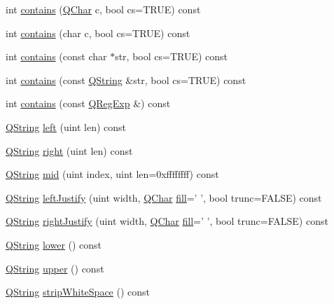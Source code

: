 \begin{DoxyCompactItemize}
\item 
int \hyperlink{class_q_string_ab8edfc96baa26c599be9a4c465723ed2}{contains} (\hyperlink{class_q_char}{Q\-Char} c, bool cs=T\-R\-U\-E) const 
\item 
int \hyperlink{class_q_string_a2ff9ac285923aa8c6f798a030730b80d}{contains} (char c, bool cs=T\-R\-U\-E) const 
\item 
int \hyperlink{class_q_string_abe7452ce01e2396702f7f158ebf38d22}{contains} (const char $\ast$str, bool cs=T\-R\-U\-E) const 
\item 
int \hyperlink{class_q_string_a9f55f57f760c31513e1dd2c71d36890b}{contains} (const \hyperlink{class_q_string}{Q\-String} \&str, bool cs=T\-R\-U\-E) const 
\item 
int \hyperlink{class_q_string_aedd4a9c1e1ccbd48eec982dd9e6abb44}{contains} (const \hyperlink{class_q_reg_exp}{Q\-Reg\-Exp} \&) const 
\item 
\hyperlink{class_q_string}{Q\-String} \hyperlink{class_q_string_a461696192a2b2b2b65e52bbb07237360}{left} (uint len) const 
\item 
\hyperlink{class_q_string}{Q\-String} \hyperlink{class_q_string_a889658a4adf3725b3b6c9e727afb968d}{right} (uint len) const 
\item 
\hyperlink{class_q_string}{Q\-String} \hyperlink{class_q_string_a368b85377d242c5b76c9b7c474659712}{mid} (uint index, uint len=0xffffffff) const 
\item 
\hyperlink{class_q_string}{Q\-String} \hyperlink{class_q_string_a737e4ee6b7428a3c80ca638f278bbe02}{left\-Justify} (uint width, \hyperlink{class_q_char}{Q\-Char} \hyperlink{class_q_string_add279e13ff7df6ca8650e7d7fa6afc14}{fill}=' ', bool trunc=F\-A\-L\-S\-E) const 
\item 
\hyperlink{class_q_string}{Q\-String} \hyperlink{class_q_string_ae683f43f31042fbe8f08c7b2ec78bcb3}{right\-Justify} (uint width, \hyperlink{class_q_char}{Q\-Char} \hyperlink{class_q_string_add279e13ff7df6ca8650e7d7fa6afc14}{fill}=' ', bool trunc=F\-A\-L\-S\-E) const 
\item 
\hyperlink{class_q_string}{Q\-String} \hyperlink{class_q_string_a05cb49857d2c462dded19e0c005d6e0e}{lower} () const 
\item 
\hyperlink{class_q_string}{Q\-String} \hyperlink{class_q_string_a39b895b169d13cd932efb636a9c8e43f}{upper} () const 
\item 
\hyperlink{class_q_string}{Q\-String} \hyperlink{class_q_string_a3a920349770fce0921c6d1c8b390e0de}{strip\-White\-Space} () const 
\item 

\end{DoxyCompactItemize}
